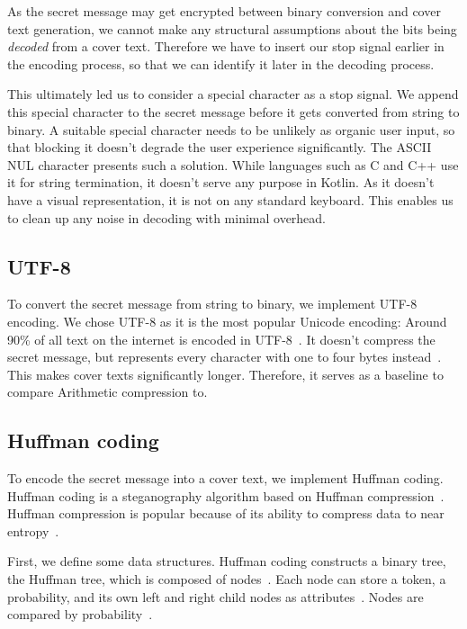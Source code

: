As the secret message may get encrypted between binary conversion and cover text generation, we cannot make any structural assumptions about the bits being \textit{decoded} from a cover text. Therefore we have to insert our stop signal earlier in the encoding process, so that we can identify it later in the decoding process.

This ultimately led us to consider a special character as a stop signal. We append this special character to the secret message before it gets converted from string to binary. A suitable special character needs to be unlikely as organic user input, so that blocking it doesn't degrade the user experience significantly. The ASCII NUL character presents such a solution. While languages such as C and C++ use it for string termination, it doesn't serve any purpose in Kotlin. As it doesn't have a visual representation, it is not on any standard keyboard. This enables us to clean up any noise in decoding with minimal overhead.

\subsection{UTF-8}
\label{sec:utf8}
To convert the secret message from string to binary, we implement UTF-8 encoding. We chose UTF-8 as it is the most popular Unicode encoding: Around 90\% of all text on the internet is encoded in UTF-8~\cite{gleaveMakingCompressionAlgorithms2017}. It doesn't compress the secret message, but represents every character with one to four bytes instead~\cite{gleaveMakingCompressionAlgorithms2017}. This makes cover texts significantly longer. Therefore, it serves as a baseline to compare Arithmetic compression to.

\subsection{Huffman coding}
\label{sec:huffmanCoding}
To encode the secret message into a cover text, we implement Huffman coding. Huffman coding is a steganography algorithm based on Huffman compression~\cite{zieglerNeuralLinguisticSteganography2019,yangRNNStegaLinguisticSteganography2019}. Huffman compression is popular because of its ability to compress data to near entropy~\cite{huffmanMethodConstructionMinimumRedundancy1952}.

First, we define some data structures. Huffman coding constructs a binary tree, the Huffman tree, which is composed of nodes~\cite{huffmanMethodConstructionMinimumRedundancy1952}. Each node can store a token, a probability, and its own left and right child nodes as attributes~\cite{huffmanMethodConstructionMinimumRedundancy1952}. Nodes are compared by probability~\cite{huffmanMethodConstructionMinimumRedundancy1952}.

